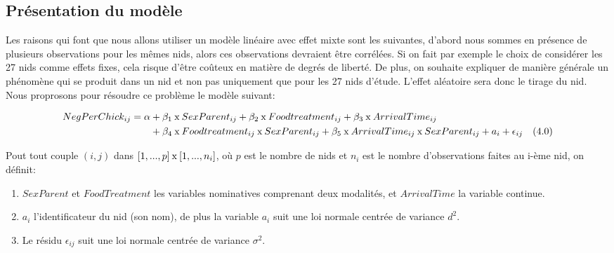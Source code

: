 \documentclass[12pt,fleqn]{book} %
\begin{document}
\newpage

\subsection{Présentation du modèle} 

\vspace{1em}

Les raisons qui font que nous allons utiliser un modèle linéaire avec effet mixte sont les suivantes, d'abord nous sommes en présence de plusieurs observations pour les mêmes nids, alors ces observations devraient être corrélées. Si on fait par exemple le choix de considérer les 27 nids comme effets fixes, cela risque d'être coûteux en matière de degrés de liberté. De plus, on souhaite expliquer de manière générale un phénomène qui se produit dans un nid et non pas uniquement que pour les 27 nids d'étude. L'effet aléatoire sera donc le tirage du nid. Nous proprosons pour résoudre ce problème le modèle suivant:

    \begin{align*}
    NegPerChick_{ij} = \alpha & + \beta_1\:\textnormal{x}\: SexParent_{ij} + \beta_2\:\textnormal{x}\: Foodtreatment_{ij} + \beta_3 \:\textnormal{x}\:ArrivalTime_{ij}\\ &+ \beta_4\:\textnormal{x}\: Foodtreatment_{ij}\:\textnormal{x}\:SexParent_{ij} + \beta_5\:\textnormal{x}\: ArrivalTime_{ij}\:\textnormal{x}\:SexParent_{ij} + a_{i} + \epsilon_{ij} \quad (4.0)
    \end{align*}
    
    \vspace{0.5em}

Pout tout couple $(i,j)$ dans $[1,...,p]\:\textnormal{x}\:[1,...,n_i]$, où $p$ est le nombre de nids et $n_i$ est le nombre d'observations faites au i-ème nid, on définit:

\begin{enumerate}
\item $SexParent$ et $FoodTreatment$ les variables nominatives comprenant deux modalités,
et $ArrivalTime$ la variable continue.
\item $a_i$ l'identificateur du nid (son nom), de plus la variable $a_i$  suit une loi normale centrée de variance $d^2$.
\item Le résidu $\epsilon_{ij}$ suit une loi normale centrée de variance $\sigma^2$.
\end{enumerate}

 \vspace{1em}
 
\end{document}
